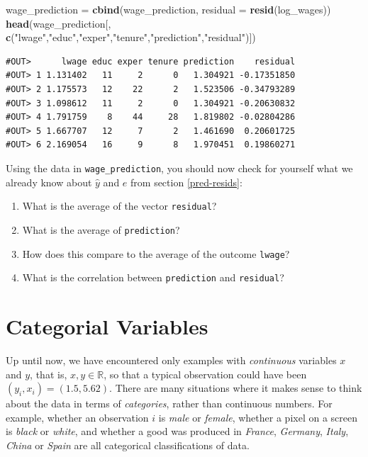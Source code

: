 \documentclass[]{book}
\newenvironment{Shaded}{\begin{snugshade}}{\end{snugshade}}
\newcommand{\DataTypeTok}[1]{\textcolor[rgb]{0.13,0.29,0.53}{#1}}
\newcommand{\KeywordTok}[1]{\textcolor[rgb]{0.13,0.29,0.53}{\textbf{#1}}}
\newcommand{\NormalTok}[1]{#1}
\newcommand{\StringTok}[1]{\textcolor[rgb]{0.31,0.60,0.02}{#1}}
\providecommand{\tightlist}{%
  \setlength{\itemsep}{0pt}\setlength{\parskip}{0pt}}
\begin{document}
\begin{Shaded}
\begin{Highlighting}[]
\NormalTok{wage_prediction =}\StringTok{ }\KeywordTok{cbind}\NormalTok{(wage_prediction, }\DataTypeTok{residual =} \KeywordTok{resid}\NormalTok{(log_wages))}
\KeywordTok{head}\NormalTok{(wage_prediction[, }\KeywordTok{c}\NormalTok{(}\StringTok{"lwage"}\NormalTok{,}\StringTok{"educ"}\NormalTok{,}\StringTok{"exper"}\NormalTok{,}\StringTok{"tenure"}\NormalTok{,}\StringTok{"prediction"}\NormalTok{,}\StringTok{"residual"}\NormalTok{)])}
\end{Highlighting}
\end{Shaded}

\begin{verbatim}
#OUT>      lwage educ exper tenure prediction    residual
#OUT> 1 1.131402   11     2      0   1.304921 -0.17351850
#OUT> 2 1.175573   12    22      2   1.523506 -0.34793289
#OUT> 3 1.098612   11     2      0   1.304921 -0.20630832
#OUT> 4 1.791759    8    44     28   1.819802 -0.02804286
#OUT> 5 1.667707   12     7      2   1.461690  0.20601725
#OUT> 6 2.169054   16     9      8   1.970451  0.19860271
\end{verbatim}

Using the data in \texttt{wage\_prediction}, you should now check for yourself what we already know about \(\hat{y}\) and \(e\) from section \ref{pred-resids}:

\begin{enumerate}
\def\labelenumi{\arabic{enumi}.}
\tightlist
\item
  What is the average of the vector \texttt{residual}?
\item
  What is the average of \texttt{prediction}?
\item
  How does this compare to the average of the outcome \texttt{lwage}?
\item
  What is the correlation between \texttt{prediction} and \texttt{residual}?
\end{enumerate}

\hypertarget{categorical-vars}{%
\chapter{Categorial Variables}\label{categorical-vars}}

Up until now, we have encountered only examples with \emph{continuous} variables \(x\) and \(y\), that is, \(x,y \in \mathbb{R}\), so that a typical observation could have been \((y_i,x_i) = (1.5,5.62)\). There are many situations where it makes sense to think about the data in terms of \emph{categories}, rather than continuous numbers. For example, whether an observation \(i\) is \emph{male} or \emph{female}, whether a pixel on a screen is \emph{black} or \emph{white}, and whether a good was produced in \emph{France}, \emph{Germany}, \emph{Italy}, \emph{China} or \emph{Spain} are all categorical classifications of data.
\end{document}
